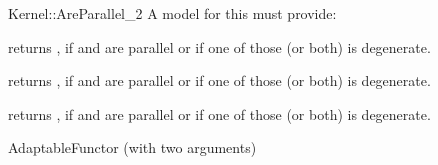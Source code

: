 \begin{ccRefFunctionObjectConcept}{Kernel::AreParallel_2}
A model for this must provide:


{returns , if  and  are parallel or if one
of those (or both) is degenerate.}

{returns , if  and  are parallel or if one
of those (or both) is degenerate.}

{returns , if  and  are parallel or if one
of those (or both) is degenerate.}

\ccRefines
AdaptableFunctor (with two arguments)

\ccSeeAlso
{} \\

\end{ccRefFunctionObjectConcept}
